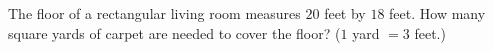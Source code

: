 The floor of a rectangular living room measures $20$ feet by $18$ feet. How many square yards of carpet are needed to cover the floor? ($1$ yard $=3$ feet.)
